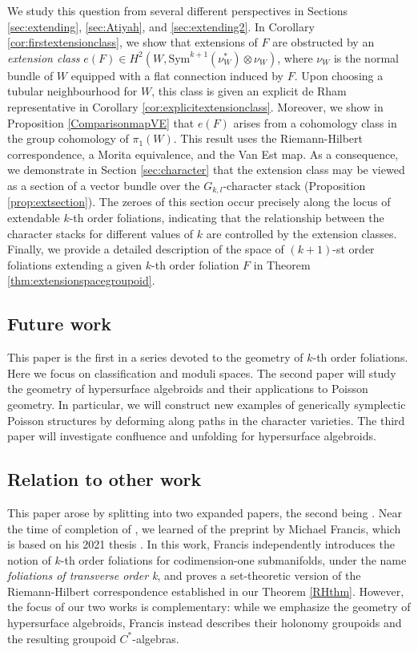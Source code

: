 \documentclass[10pt]{amsart}
\numberwithin{theoremalpha}{section}
\numberwithin{equation}{section}
\numberwithin{definition}{section}
\numberwithin{theorem}{section}
\numberwithin{proposition}{section}
\numberwithin{lemma}{section}
\numberwithin{example}{section}
\numberwithin{remark}{section}
\numberwithin{corollary}{section}
\numberwithin{question}{section}
\numberwithin{problem}{section}
\numberwithin{assumption}{section}
\theoremstyle{named}
\numberwithin{equation}{section}
\begin{document}
We study this question from several different perspectives in Sections \ref{sec:extending}, \ref{sec:Atiyah}, and \ref{sec:extending2}. In Corollary \ref{cor:firstextensionclass}, we show that extensions of $F$ are obstructed by an \emph{extension class} $e(F) \in H^{2}(W, \mathrm{Sym}^{k+1}(\nu_W^*) \otimes \nu_W)$, where $\nu_W$ is the normal bundle of $W$ equipped with a flat connection induced by $F$. Upon choosing a tubular neighbourhood for $W$, this class is given an explicit de Rham representative in Corollary \ref{cor:explicitextensionclass}. Moreover, we show in Proposition \ref{ComparisonmapVE} that $e(F)$ arises from a cohomology class in the group cohomology of $\pi_{1}(W)$. This result uses the Riemann-Hilbert correspondence, a Morita equivalence, and the Van Est map. As a consequence, we demonstrate in Section \ref{sec:character} that the extension class may be viewed as a section of a vector bundle over the $G_{k,l}$-character stack (Proposition \ref{prop:extsection}). The zeroes of this section occur precisely along the locus of extendable $k$-th order foliations, indicating that the relationship between the character stacks for different values of $k$ are controlled by the extension classes. Finally, we provide a detailed description of the space of $(k+1)$-st order foliations extending a given $k$-th order foliation $F$ in Theorem \ref{thm:extensionspacegroupoid}. 

\subsection{Future work}

This paper is the first in a series devoted to the geometry of $k$-th order foliations. Here we focus on classification and moduli spaces. The second paper \cite{workinprogess} will study the geometry of hypersurface algebroids and their applications to Poisson geometry. In particular, we will construct new examples of generically symplectic Poisson structures by deforming along paths in the character varieties. The third paper will investigate confluence and unfolding for hypersurface algebroids. 

\subsection{Relation to other work}

This paper arose by splitting \cite{BPW23} into two expanded papers, the second being \cite{workinprogess}. Near the time of completion of \cite{BPW23}, we learned of the preprint \cite{francis2024singular} by Michael Francis, which is based on his 2021 thesis \cite{francis2021groupoids}. In this work, Francis independently introduces the notion of $k$-th order foliations for codimension-one submanifolds, under the name \emph{foliations of transverse order k}, and proves a set-theoretic version of the Riemann-Hilbert correspondence established in our Theorem \ref{RHthm}. However, the focus of our two works is complementary: while we emphasize the geometry of hypersurface algebroids, Francis instead describes their holonomy groupoids and the resulting groupoid $C^*$-algebras. 
\end{document}
